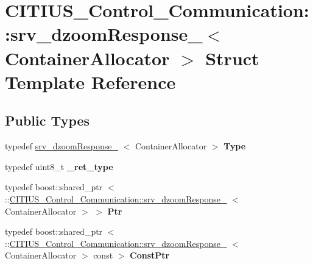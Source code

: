 \hypertarget{struct_c_i_t_i_u_s___control___communication_1_1srv__dzoom_response__}{\section{\-C\-I\-T\-I\-U\-S\-\_\-\-Control\-\_\-\-Communication\-:\-:srv\-\_\-dzoom\-Response\-\_\-$<$ \-Container\-Allocator $>$ \-Struct \-Template \-Reference}
\label{struct_c_i_t_i_u_s___control___communication_1_1srv__dzoom_response__}
}
\subsection*{\-Public \-Types}
\begin{DoxyCompactItemize}
\item 
\hypertarget{struct_c_i_t_i_u_s___control___communication_1_1srv__dzoom_response___a2462939fcd06f7859a4ef8ddfa9a5dbe}{typedef \hyperlink{struct_c_i_t_i_u_s___control___communication_1_1srv__dzoom_response__}{srv\-\_\-dzoom\-Response\-\_\-}\*
$<$ \-Container\-Allocator $>$ {\bfseries \-Type}}\label{struct_c_i_t_i_u_s___control___communication_1_1srv__dzoom_response___a2462939fcd06f7859a4ef8ddfa9a5dbe}

\item 
\hypertarget{struct_c_i_t_i_u_s___control___communication_1_1srv__dzoom_response___a4bf64add160a1a918f277cb027dc392c}{typedef uint8\-\_\-t {\bfseries \-\_\-ret\-\_\-type}}\label{struct_c_i_t_i_u_s___control___communication_1_1srv__dzoom_response___a4bf64add160a1a918f277cb027dc392c}

\item 
\hypertarget{struct_c_i_t_i_u_s___control___communication_1_1srv__dzoom_response___a6c75dd0185f1712296926ef9c92d20bf}{typedef boost\-::shared\-\_\-ptr\*
$<$ \-::\hyperlink{struct_c_i_t_i_u_s___control___communication_1_1srv__dzoom_response__}{\-C\-I\-T\-I\-U\-S\-\_\-\-Control\-\_\-\-Communication\-::srv\-\_\-dzoom\-Response\-\_\-}\*
$<$ \-Container\-Allocator $>$ $>$ {\bfseries \-Ptr}}\label{struct_c_i_t_i_u_s___control___communication_1_1srv__dzoom_response___a6c75dd0185f1712296926ef9c92d20bf}

\item 
\hypertarget{struct_c_i_t_i_u_s___control___communication_1_1srv__dzoom_response___a43928b2af9ae26925aef777d3bbaabbe}{typedef boost\-::shared\-\_\-ptr\*
$<$ \-::\hyperlink{struct_c_i_t_i_u_s___control___communication_1_1srv__dzoom_response__}{\-C\-I\-T\-I\-U\-S\-\_\-\-Control\-\_\-\-Communication\-::srv\-\_\-dzoom\-Response\-\_\-}\*
$<$ \-Container\-Allocator $>$ const  $>$ {\bfseries \-Const\-Ptr}}\label{struct_c_i_t_i_u_s___control___communication_1_1srv__dzoom_response___a43928b2af9ae26925aef777d3bbaabbe}

\end{DoxyCompactItemize}
